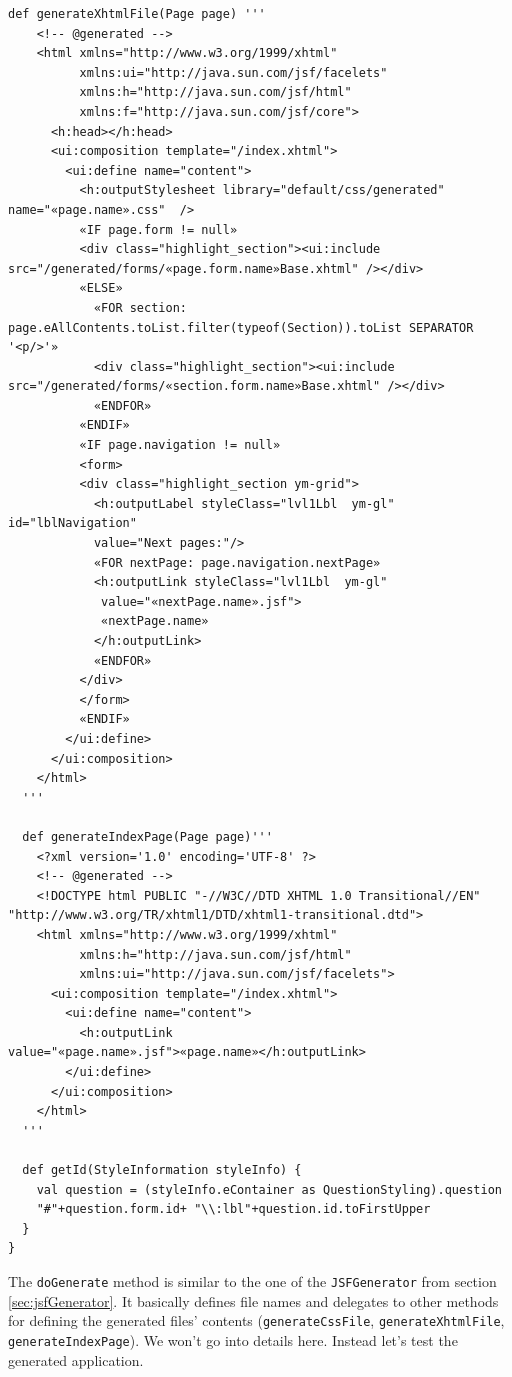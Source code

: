 \begin{lstlisting}[language=Xtend]
  def generateXhtmlFile(Page page) '''
    <!-- @generated -->
    <html xmlns="http://www.w3.org/1999/xhtml"
	      xmlns:ui="http://java.sun.com/jsf/facelets"
	      xmlns:h="http://java.sun.com/jsf/html"
	      xmlns:f="http://java.sun.com/jsf/core">
	  <h:head></h:head>
	  <ui:composition template="/index.xhtml">
	    <ui:define name="content">
	      <h:outputStylesheet library="default/css/generated" name="«page.name».css"  />
	      «IF page.form != null»
	      <div class="highlight_section"><ui:include src="/generated/forms/«page.form.name»Base.xhtml" /></div>
	      «ELSE»
	        «FOR section: page.eAllContents.toList.filter(typeof(Section)).toList SEPARATOR '<p/>'»
	        <div class="highlight_section"><ui:include src="/generated/forms/«section.form.name»Base.xhtml" /></div>
	        «ENDFOR»
	      «ENDIF»
	      «IF page.navigation != null»
	      <form>
	      <div class="highlight_section ym-grid">
	        <h:outputLabel styleClass="lvl1Lbl  ym-gl" id="lblNavigation"
	        value="Next pages:"/>
	        «FOR nextPage: page.navigation.nextPage»
	        <h:outputLink styleClass="lvl1Lbl  ym-gl"
	         value="«nextPage.name».jsf">
	         «nextPage.name»
	        </h:outputLink>
	        «ENDFOR»
	      </div>
	      </form>
	      «ENDIF»
	    </ui:define>
	  </ui:composition>
	</html>
  '''
    
  def generateIndexPage(Page page)'''
	<?xml version='1.0' encoding='UTF-8' ?>
	<!-- @generated -->
	<!DOCTYPE html PUBLIC "-//W3C//DTD XHTML 1.0 Transitional//EN" "http://www.w3.org/TR/xhtml1/DTD/xhtml1-transitional.dtd">
	<html xmlns="http://www.w3.org/1999/xhtml"
	      xmlns:h="http://java.sun.com/jsf/html"
	      xmlns:ui="http://java.sun.com/jsf/facelets">
	  <ui:composition template="/index.xhtml">
	    <ui:define name="content">
	      <h:outputLink value="«page.name».jsf">«page.name»</h:outputLink>
	    </ui:define>
	  </ui:composition>
	</html>
  '''	
	
  def getId(StyleInformation styleInfo) {
    val question = (styleInfo.eContainer as QuestionStyling).question
    "#"+question.form.id+ "\\:lbl"+question.id.toFirstUpper
  }
}
\end{lstlisting}

The \texttt{doGenerate} method is similar to the one of the
\texttt{JSFGenerator} from section \ref{sec:jsfGenerator}. It basically defines
file names and delegates to other methods for defining the generated files'
contents (\texttt{generateCssFile}, \texttt{generateXhtmlFile},
\texttt{generateIndexPage}). We won't go into details here. Instead let's test
the generated application.

